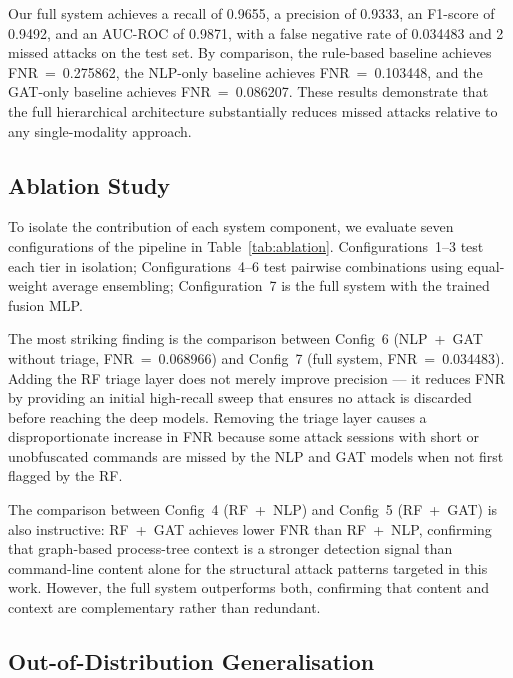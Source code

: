 Our full system achieves a recall of 0.9655, a precision of 0.9333,
an F1-score of 0.9492, and an AUC-ROC of 0.9871, with a false negative
rate of 0.034483 and 2 missed attacks on the test set.
By comparison, the rule-based baseline achieves FNR~=~0.275862,
the NLP-only baseline achieves FNR~=~0.103448, and the GAT-only
baseline achieves FNR~=~0.086207. These results demonstrate that
the full hierarchical architecture substantially reduces missed attacks
relative to any single-modality approach.



\subsection{Ablation Study}
\label{sec:ablation}

To isolate the contribution of each system component, we evaluate seven
configurations of the pipeline in Table~\ref{tab:ablation}.
Configurations~1--3 test each tier in isolation; Configurations~4--6
test pairwise combinations using equal-weight average ensembling;
Configuration~7 is the full system with the trained fusion MLP.

The most striking finding is the comparison between Config~6
(NLP~+~GAT without triage, FNR~=~0.068966) and Config~7
(full system, FNR~=~0.034483). Adding the RF triage layer does not
merely improve precision --- it reduces FNR by providing an initial
high-recall sweep that ensures no attack is discarded before reaching
the deep models. Removing the triage layer causes a disproportionate
increase in FNR because some attack sessions with short or unobfuscated
commands are missed by the NLP and GAT models when not first flagged
by the RF.

The comparison between Config~4 (RF~+~NLP) and Config~5 (RF~+~GAT) is
also instructive: RF~+~GAT achieves lower FNR than RF~+~NLP, confirming
that graph-based process-tree context is a stronger detection signal than
command-line content alone for the structural attack patterns targeted
in this work. However, the full system outperforms both, confirming that
content and context are complementary rather than redundant.



\subsection{Out-of-Distribution Generalisation}
\label{sec:ood}


